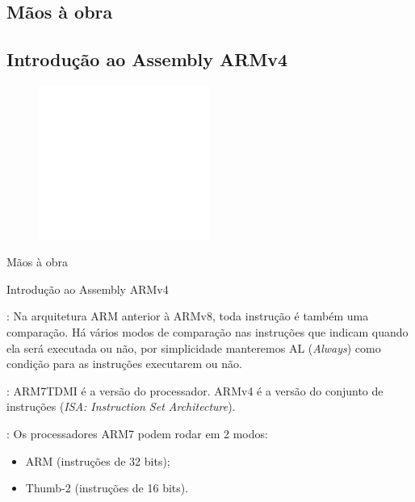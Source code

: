 \documentclass{beamer}
\let\emph\relax %
\begin{document}
\begin{darkframes}
\section{Mãos à obra}
\subsection{Introdução ao Assembly ARMv4}
\begin{frame}
    \begin{center}
        \begin{figure}[h!]
            \centering
            \includegraphics[width=0.5\textwidth,height=0.5\textheight,keepaspectratio]{pencil}
        \end{figure}
        \huge Mãos à obra

        \normalsize Introdução ao Assembly ARMv4
    \end{center}
\end{frame}

\begin{frame}{\secname: \subsecname}
    Na arquitetura ARM anterior à ARMv8, toda instrução é também uma
    comparação. Há vários modos de comparação nas instruções que indicam
    quando ela será executada ou não, por simplicidade manteremos AL
    (\textit{Always}) como condição para as instruções executarem ou não.


    \emph{OBS}: ARM7TDMI é a versão do processador. ARMv4 é a versão do
    conjunto de instruções (\textit{ISA: Instruction Set Architecture}).
\end{frame}

\begin{frame}{\secname: \subsecname}
    Os processadores ARM7 podem rodar em 2 modos:
    \begin{itemize}
        \item ARM (instruções de 32 bits);
        \item Thumb-2 (instruções de 16 bits).
    \end{itemize}



\end{frame}
\end{darkframes}
\end{document}

